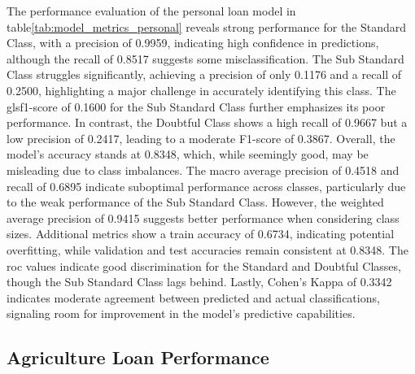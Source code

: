 \documentclass[a4paper]{article}
\begin{document}
\noindent The performance evaluation of the personal loan model in table\ref{tab:model_metrics_personal} reveals strong performance for the Standard Class, with a precision of 0.9959, indicating high confidence in predictions, although the recall of 0.8517 suggests some misclassification. The Sub Standard Class struggles significantly, achieving a precision of only 0.1176 and a recall of 0.2500, highlighting a major challenge in accurately identifying this class. The gls{f1}-score of 0.1600 for the Sub Standard Class further emphasizes its poor performance. In contrast, the Doubtful Class shows a high recall of 0.9667 but a low precision of 0.2417, leading to a moderate F1-score of 0.3867. Overall, the model's accuracy stands at 0.8348, which, while seemingly good, may be misleading due to class imbalances. The macro average precision of 0.4518 and recall of 0.6895 indicate suboptimal performance across classes, particularly due to the weak performance of the Sub Standard Class. However, the weighted average precision of 0.9415 suggests better performance when considering class sizes. Additional metrics show a train accuracy of 0.6734, indicating potential overfitting, while validation and test accuracies remain consistent at 0.8348. The \gls{roc} values indicate good discrimination for the Standard and Doubtful Classes, though the Sub Standard Class lags behind. Lastly, Cohen’s Kappa of 0.3342 indicates moderate agreement between predicted and actual classifications, signaling room for improvement in the model's predictive capabilities.

\subsection{Agriculture Loan Performance}
\end{document}
